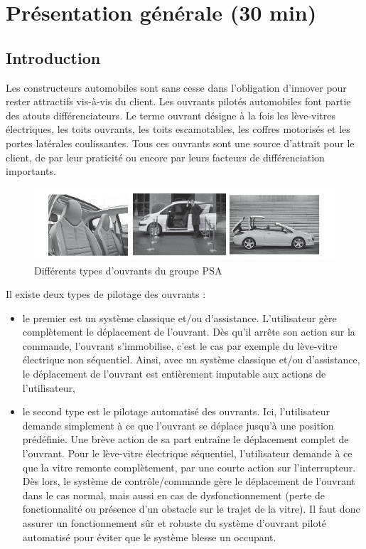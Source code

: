 

\section{Présentation générale (30 min)}

\subsection{Introduction}

Les constructeurs automobiles sont sans cesse dans l'obligation d'innover pour rester attractifs vis-à-vis du client. Les ouvrants pilotés automobiles font partie des atouts différenciateurs. Le terme ouvrant désigne à la fois les lève-vitres électriques, les toits ouvrants, les toits escamotables, les coffres motorisés et les portes latérales coulissantes. Tous ces ouvrants sont une source d'attrait pour le client, de par leur praticité ou encore par leurs facteurs de différenciation importants.

\begin{figure}[!h]
 \centering\includegraphics[width=0.9\linewidth]{img/img01}
 \caption{Différents types d'ouvrants du groupe PSA}
 \label{img01}
\end{figure}

Il existe deux types de pilotage des ouvrants :
\begin{itemize}
 \item le premier est un système classique et/ou d'assistance. L'utilisateur gère complètement le déplacement de l'ouvrant. Dès qu'il arrête son action sur la commande, l'ouvrant s'immobilise, c'est le cas par exemple du lève-vitre électrique non séquentiel. Ainsi, avec un système classique et/ou d'assistance, le déplacement de l'ouvrant est entièrement imputable aux actions de l'utilisateur,
 \item le second type est le pilotage automatisé des ouvrants. Ici, l'utilisateur demande simplement à ce que l'ouvrant se déplace jusqu'à une position prédéfinie. Une brève action de sa part entraîne le déplacement complet de l'ouvrant. Pour le lève-vitre électrique séquentiel, l'utilisateur demande à ce que la vitre remonte complètement, par une courte action sur l'interrupteur. Dès lors, le système de contrôle/commande gère le déplacement de l'ouvrant dans le cas normal, mais aussi en cas de dysfonctionnement (perte de fonctionnalité ou présence d'un obstacle sur le trajet de la vitre). Il faut donc assurer un fonctionnement sûr et robuste du système d'ouvrant piloté automatisé pour éviter que le système blesse un occupant.
\end{itemize}

